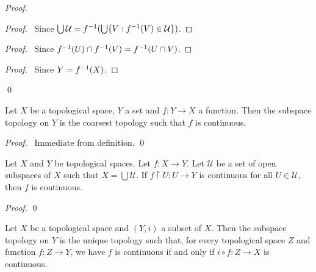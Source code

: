 \begin{proof}
\pf
{}
\begin{proof}
	\pf\ Since $\bigcup \mathcal{U} = {f}^{-1}(\bigcup \{ V : {f}^{-1}(V) \in \mathcal{U}\})$.
\end{proof}
\begin{proof}
	\pf\ Since ${f}^{-1}(U) \cap {f}^{-1}(V) = {f}^{-1}(U 
\cap V)$.
\end{proof}
\begin{proof}
	\pf\ Since $Y = {f}^{-1}(X)$.
\end{proof}
\qed
\end{proof}

\begin{prop}
Let $X$ be a topological space, $Y$ a set and $f : Y \rightarrow X$ a function. Then the subspace topology on $Y$ is the coarsest topology such that $f$ is continuous.
\end{prop}

\begin{proof}
\pf\ Immediate from definition. \qed
\end{proof}

\begin{prop}
Let $X$ and $Y$ be topological spaces. Let $f : X \rightarrow Y$. Let $\mathcal{U}$ be a set of open subspaces of $X$ such that $X = \bigcup \mathcal{U}$. If $f \restriction U : U \rightarrow Y$ is continuous for all $U \in \mathcal{U}$, then $f$ is continuous.
\end{prop}

\begin{proof}
\pf
{}
\qed
\end{proof}

\begin{thm}
\label{thm:subspace_universal}
Let $X$ be a topological space and $(Y,i)$ a subset of $X$. Then the subspace topology on $Y$ is the unique topology such that, for every topological space $Z$ and function $f : Z \rightarrow Y$, we have $f$ is continuous if and only if $i \circ f : Z \rightarrow X$ is continuous.
\end{thm}

